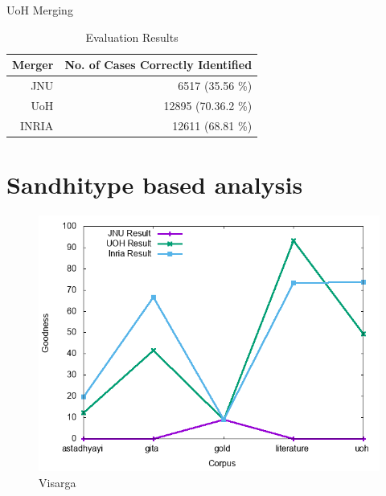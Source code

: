\documentclass[11pt]{article}
\begin{document}
UoH Merging

\begin{table}[h]
	\begin{center}
		\begin{tabular}{| r | r | }
			\hline  \bf Merger & \bf No. of Cases Correctly Identified \\
			\hline
			JNU & 6517 (35.56 \%) \\
			UoH & 12895 (70.36.2 \%) \\
			INRIA & 12611 (68.81 \%)\\
			\hline
		\end{tabular}
	\end{center}
	\caption{\label{font-table} Evaluation Results }
\end{table}


\section{Sandhitype based analysis}

\begin{figure}[h]
	\center
	\includegraphics[scale=0.34]{images/visarga.png}
	\caption{\label{screen}Visarga}
\end{figure}
\end{document}

